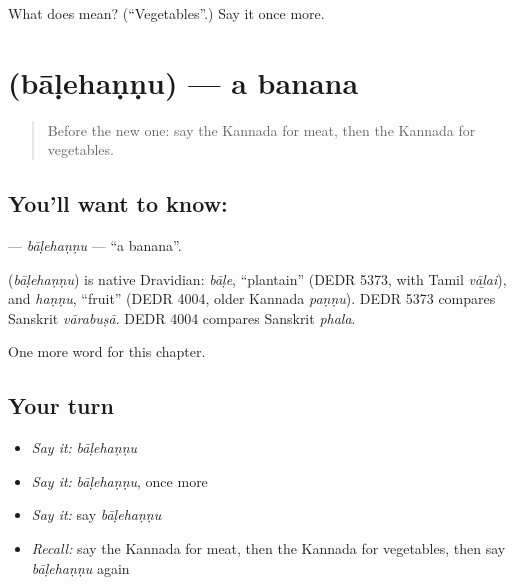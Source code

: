 \begin{tcolorbox}[breakable,colback=teal!4,colframe=teal!35!black,title={Before you move on}]
What does  mean? (\textquotedblleft{}Vegetables\textquotedblright{}.) Say it once more.
\end{tcolorbox}
\section[\texorpdfstring{\kn{ಬಾಳೆಹಣ್ಣು} (bāḷehaṇṇu)}{ಬಾಳೆಹಣ್ಣು (bāḷehaṇṇu)}]{ (bāḷehaṇṇu) — a banana}

\label{lesson:KA-C123-balehannu}



\begin{quote}
Before the new one: say the Kannada for meat, then the Kannada for vegetables.
\end{quote}

\subsection*{You'll want to know: }
\textbf{} — \emph{bāḷehaṇṇu} — \textquotedblleft{}a banana\textquotedblright{}.

\begin{cousinweb}
\textbf{} (\emph{bāḷehaṇṇu}) is native Dravidian: \emph{bāḷe}, \textquotedblleft{}plantain\textquotedblright{} (DEDR 5373, with Tamil \emph{vāḻai}), and \emph{haṇṇu}, \textquotedblleft{}fruit\textquotedblright{} (DEDR 4004, older Kannada \emph{paṇṇu}). DEDR 5373 compares Sanskrit \emph{vārabuṣā}. DEDR 4004 compares Sanskrit \emph{phala}.
\end{cousinweb}

\begin{grammarlens}[title={What you've built}]
One more word for this chapter.
\end{grammarlens}

\subsection*{Your turn}
\begin{itemize}
\raggedright
  \item \emph{Say it:} \emph{bāḷehaṇṇu}
  \item \emph{Say it:} \emph{bāḷehaṇṇu}, once more
  \item \emph{Say it:} say \emph{bāḷehaṇṇu}
  \item \emph{Recall:} say the Kannada for meat, then the Kannada for vegetables, then say \emph{bāḷehaṇṇu} again
\end{itemize}

